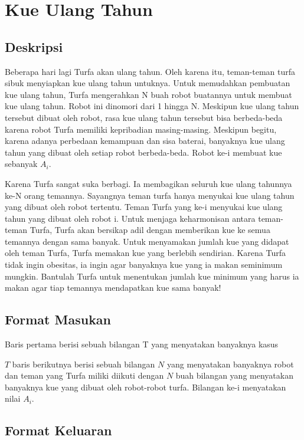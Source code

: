 \documentclass{article}
\begin{document}
\section*{\hfil Kue Ulang Tahun\hfil}

\subsection*{Deskripsi}
\par Beberapa hari lagi Turfa akan ulang tahun. Oleh karena itu, teman-teman turfa sibuk menyiapkan kue ulang tahun untuknya. Untuk memudahkan pembuatan kue ulang tahun, Turfa mengerahkan N buah robot buatannya untuk membuat kue ulang tahun. Robot ini dinomori dari 1 hingga N. Meskipun kue ulang tahun tersebut dibuat oleh robot, rasa kue ulang tahun tersebut bisa berbeda-beda karena robot Turfa memiliki kepribadian masing-masing. Meskipun begitu, karena adanya perbedaan kemampuan dan sisa baterai, banyaknya kue ulang tahun yang dibuat oleh setiap robot berbeda-beda. Robot ke-i membuat kue sebanyak $A_i$.
\par Karena Turfa sangat suka berbagi. Ia membagikan seluruh kue ulang tahunnya ke-N orang temannya. Sayangnya teman turfa hanya menyukai kue ulang tahun yang dibuat oleh robot tertentu. Teman Turfa yang ke-i menyukai kue ulang tahun yang dibuat oleh robot i. Untuk menjaga keharmonisan antara teman-teman Turfa, Turfa akan bersikap adil dengan memberikan kue ke semua temannya dengan sama banyak. Untuk menyamakan jumlah kue yang didapat oleh teman Turfa, Turfa memakan kue yang berlebih sendirian. Karena Turfa tidak ingin obesitas, ia ingin agar banyaknya kue yang ia makan seminimum mungkin. Bantulah Turfa untuk menentukan jumlah kue minimum yang harus ia makan agar tiap temannya mendapatkan kue sama banyak!

\subsection*{Format Masukan}
\par Baris pertama berisi sebuah bilangan T yang menyatakan banyaknya kasus
\par $T$ baris berikutnya berisi sebuah bilangan $N$ yang menyatakan banyaknya robot dan teman yang Turfa miliki diikuti dengan $N$ buah bilangan yang menyatakan banyaknya kue yang dibuat oleh robot-robot turfa. Bilangan ke-i menyatakan nilai $A_i$.

\subsection*{Format Keluaran}
\end{document}
